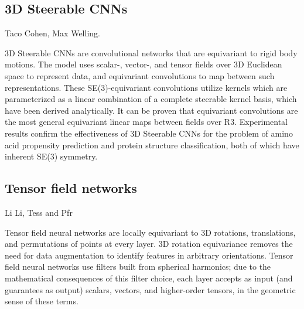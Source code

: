 \documentclass[book.tex]{subfiles}
\begin{document}
\subsection{3D Steerable CNNs}
Taco Cohen, Max Welling.

3D Steerable CNNs are convolutional networks that are equivariant to rigid body motions.
The model uses scalar-, vector-, and tensor fields over 3D Euclidean space to
represent data, and equivariant convolutions to map between such representations.
These SE(3)-equivariant convolutions utilize kernels which are parameterized
as a linear combination of a complete steerable kernel basis, which have been derived
analytically. It can be proven that equivariant convolutions are the most
general equivariant linear maps between fields over R3. Experimental results
confirm the effectiveness of 3D Steerable CNNs for the problem of amino acid
propensity prediction and protein structure classification, both of which have
inherent SE(3) symmetry.
\subsection{Tensor field networks}
Li Li, Tess and Pfr

Tensor field neural networks are locally equivariant to 3D
rotations, translations, and permutations of points at every layer. 3D rotation
equivariance removes the need for data augmentation to identify features in arbitrary
orientations. Tensor field neural networks use filters built from spherical harmonics; due to the
mathematical consequences of this filter choice, each layer accepts as input (and
guarantees as output) scalars, vectors, and higher-order tensors, in the geometric
sense of these terms. 
\end{document}
